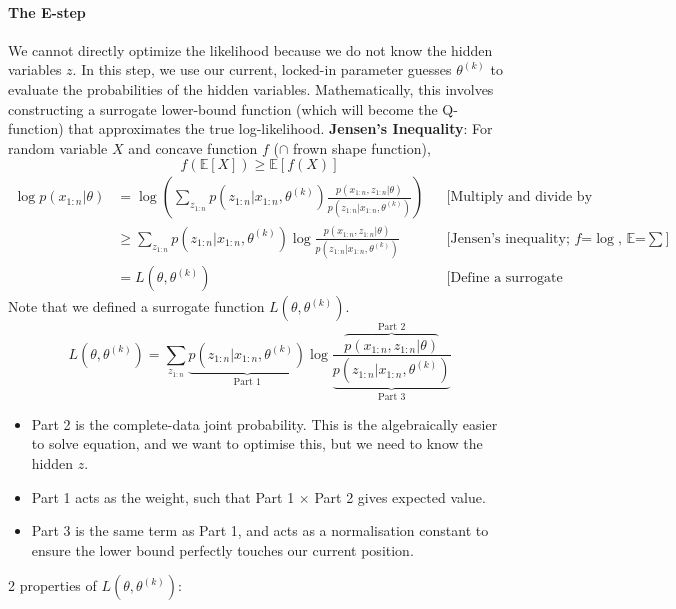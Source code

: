 \documentclass[../Probability.tex]{subfiles}
\begin{document}
\paragraph{The E-step} We cannot directly optimize the likelihood because we do not know the hidden variables $z$. In this step, we use our current, locked-in parameter guesses $\theta^{(k)}$ to evaluate the probabilities of the hidden variables.
Mathematically, this involves constructing a surrogate lower-bound function (which will become the Q-function) that approximates the true log-likelihood.\newline
\textbf{Jensen's Inequality}: For random variable $X$ and concave function $f$ ($\cap$ frown shape function),
$$f(\mathbb{E}[X]) \ge \mathbb{E}[f(X)]$$
\begin{align*}
    \log p(x_{1:n}|\theta) &= \log \left( \sum_{z_{1:n}} p(z_{1:n}|x_{1:n}, \theta^{(k)}) \frac{p(x_{1:n}, z_{1:n}|\theta)}{p(z_{1:n}|x_{1:n}, \theta^{(k)})} \right) && \text{[Multiply and divide by posterior]} \\
    &\ge \sum_{\textstyle z_{1:n}} p(z_{1:n}|x_{1:n}, \theta^{(k)}) \log \frac{p(x_{1:n}, z_{1:n}|\theta)}{p(z_{1:n}|x_{1:n}, \theta^{(k)})} && \text{[Jensen's inequality; $f$=$\log$, $\mathbb{E}$=$\textstyle\sum$]} \\
    &= L(\theta, \theta^{(k)}) && \text{[Define a surrogate function]}
\end{align*}
Note that we defined a surrogate function $L(\theta, \theta^{(k)})$.
$$L(\theta, \theta^{(k)}) = \sum_{z_{1:n}} \underbrace{p(z_{1:n}|x_{1:n}, \theta^{(k)})}_{\text{Part 1}} \log \frac{\overbrace{p(x_{1:n}, z_{1:n}|\theta)}^{\text{Part 2}}}{\underbrace{p(z_{1:n}|x_{1:n}, \theta^{(k)})}_{\text{Part 3}}}$$
\begin{itemize}
    \item Part 2 is the complete-data joint probability. This is the algebraically easier to solve equation, and we want to optimise this, but we need to know the hidden $z$.
    \item Part 1 acts as the weight, such that Part 1 $\times$ Part 2 gives expected value.
    \item Part 3 is the same term as Part 1, and acts as a normalisation constant to ensure the lower bound perfectly touches our current position.
\end{itemize}
2 properties of $L(\theta, \theta^{(k)})$:
\end{document}
